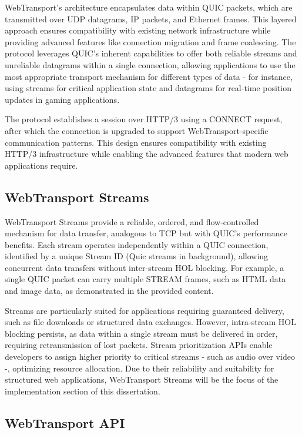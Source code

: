 WebTransport's architecture encapsulates data within QUIC packets, which are transmitted over UDP datagrams, IP packets, and Ethernet frames. This layered approach ensures compatibility with existing network infrastructure while providing advanced features like connection migration and frame coalescing. The protocol leverages QUIC's inherent capabilities to offer both reliable streams and unreliable datagrams within a single connection, allowing applications to use the most appropriate transport mechanism for different types of data - for instance, using streams for critical application state and datagrams for real-time position updates in gaming applications.

The protocol establishes a session over HTTP/3 using a CONNECT request, after which the connection is upgraded to support WebTransport-specific communication patterns. This design ensures compatibility with existing HTTP/3 infrastructure while enabling the advanced features that modern web applications require.

\subsection{WebTransport Streams}

WebTransport Streams provide a reliable, ordered, and flow-controlled mechanism for data transfer, analogous to TCP but with QUIC’s performance benefits. Each stream operates independently within a QUIC connection, identified by a unique Stream ID (Quic streams in background), allowing concurrent data transfers without inter-stream HOL blocking. For example, a single QUIC packet can carry multiple STREAM frames, such as HTML data and image data, as demonstrated in the provided content.

Streams are particularly suited for applications requiring guaranteed delivery, such as file downloads or structured data exchanges. However, intra-stream HOL blocking persists, as data within a single stream must be delivered in order, requiring retransmission of lost packets. Stream prioritization APIs enable developers to assign higher priority to critical streams - such as audio over video -, optimizing resource allocation. Due to their reliability and suitability for structured web applications, WebTransport Streams will be the focus of the implementation section of this dissertation.

\subsection{WebTransport API}

